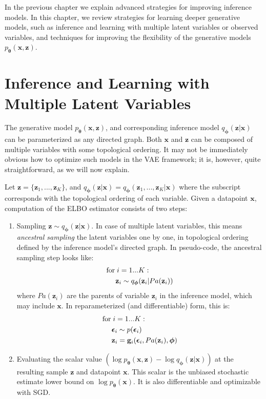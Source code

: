 \documentclass[MAL,biber]{nowfnt} %
\newcommand{\bb}[1]{\mathbf{#1}}
\newcommand{\bx}{\bb{x}}
\newcommand{\bg}{\bb{g}}
\newcommand{\bz}{\bb{z}}
\newcommand{\bT}{\boldsymbol{\theta}}
\newcommand{\bphi}{\boldsymbol{\phi}}
\newcommand{\beps}{\boldsymbol{\epsilon}}
\newcommand{\pT}{p_{\bT}}
\newcommand{\qP}{q_{\bphi}}
\begin{document}
In the previous chapter we explain advanced strategies for improving inference models. In this chapter, we review strategies for learning deeper generative models, such as inference and learning with multiple latent variables or observed variables, and techniques for improving the flexibility of the generative models $\pT(\bx,\bz)$.

\section{Inference and Learning with Multiple Latent Variables}
\label{sec:multiplelatentvariables}

The generative model $\pT(\bx,\bz)$, and corresponding inference model $\qP(\bz|\bx)$ can be parameterized as any directed graph. Both $\bx$ and $\bz$ can be composed of multiple variables with some topological ordering. It may not be immediately obvious how to optimize such models in the VAE framework; it is, however, quite straightforward, as we will now explain.

 Let $\bz = \{\bz_1,...,\bz_K\}$, and $\qP(\bz|\bx) = \qP(\bz_1,...,\bz_K|\bx)$ where the subscript corresponds with the topological ordering of each variable. Given a datapoint $\bx$, computation of the ELBO estimator consists of two steps:
\begin{enumerate}
	\item Sampling $\bz \sim \qP(\bz|\bx)$. In case of multiple latent variables, this means \emph{ancestral sampling} the latent variables one by one, in topological ordering defined by the inference model's directed graph. In pseudo-code, the ancestral sampling step looks like:
	\begin{align}
	&\text{for\;} i = 1 ... K:\\
	&\quad\; \bz_i \sim \qP(\bz_i | Pa(\bz_i))
	\end{align}
	where $Pa(\bz_i)$ are the parents of variable $\bz_i$ in the inference model, which may include $\bx$. In reparameterized (and differentiable) form, this is:
	\begin{align}
	&\text{for\;} i = 1 ... K:\\
	&\quad\; \beps_i \sim p(\beps_i)\\
	&\quad\; \bz_i = \bg_i(\beps_i,Pa(\bz_i),\bphi)
	\end{align}
	\item Evaluating the scalar value $(\log \pT(\bx,\bz) - \log \qP(\bz|\bx))$ at the resulting sample $\bz$ and datapoint $\bx$. This scalar is the unbiased stochastic estimate lower bound on $\log \pT(\bx)$. It is also differentiable and optimizable with SGD.
\end{enumerate}
\end{document}
